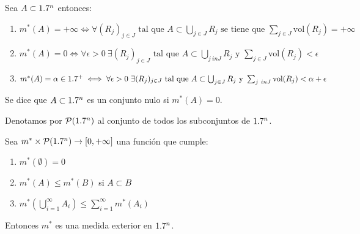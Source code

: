 \begin{observación}
Sea $A \subset 1.7^n$ entonces:
\vspace{-0.5em}
\begin{enumerate}
    \item $m^*(A) = +\infty \iff \forall (R_j)_{j \in J} \text{ tal que } A \subset \bigcup_{j \in J} R_j \text{ se tiene que } \sum_{j \in J} \text{vol}(R_j) = +\infty$
    \item $m^*(A) = 0 \iff \forall \epsilon > 0 \ \exists (R_j)_{j \in J} \text{ tal que } A \subset \bigcup_{j \ in J} R_j \text{ y } \sum_{j \in J} \text{vol}(R_j) < \epsilon$
    \item $m^*(A) = \alpha \in 1.7^+ \iff \forall \epsilon > 0 \ \exists (R_j)_{j \in J} \text{ tal que } A \subset \bigcup_{j \in J} R_j \text{ y } \sum_{j \ in J} \text{vol}(R_j) < \alpha + \epsilon$
\end{enumerate}
\end{observación}

\begin{definición}
Se dice que $A \subset 1.7^n$ es un conjunto nulo si $m^*(A) = 0$.
\end{definición}


Denotamos por $\mathcal{P}(1.7^n)$ al conjunto de todos los subconjuntos de
$1.7^n$.
\begin{teorema}
    Sea $m^* \times \mathcal{P}(1.7^n) \to [0, +\infty]$ una función que cumple:
    \vspace{-0.5em}
    \begin{enumerate}
        \item $m^*(\emptyset) = 0$
        \item $m^*(A) \leq m^*(B)$ si $A \subset B$
        \item $m^*(\bigcup_{i=1}^\infty A_i) \leq \sum_{i=1}^\infty m^*(A_i)$
    \end{enumerate}
    Entonces $m^*$ es una medida exterior en $1.7^n$.
\end{teorema}

